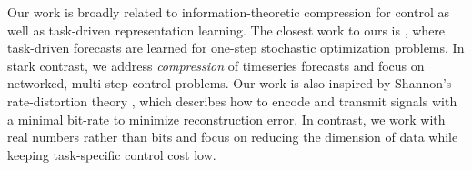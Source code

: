 
Our work is broadly related to information-theoretic compression for control as well as task-driven representation learning. The closest work to ours is \cite{donti2017task}, where task-driven forecasts are learned for one-step stochastic optimization problems. In stark contrast, we address \textit{compression} of timeseries forecasts and focus on networked, multi-step control problems. Our work is also inspired by Shannon's rate-distortion theory \cite{berger2003rate}, which describes how to encode and transmit signals with a minimal bit-rate to minimize reconstruction error.
In contrast, we work with real numbers rather than bits and focus on reducing the dimension of data while keeping task-specific control cost low.

